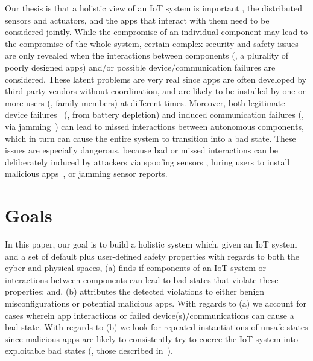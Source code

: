 Our thesis is that a holistic view of an IoT system is important \ie,
the distributed sensors and actuators, and the apps
that interact with them need to be considered jointly.
While the compromise of an individual component may lead to
the compromise of the whole system,
certain complex security and safety issues are only revealed when the interactions
between components (\eg, a plurality of poorly designed apps) and/or possible {\color{black}device/communication failures}
are considered.
These latent problems are very real since apps are often developed by
third-party vendors without coordination,
and are likely to be installed by one or more users (\eg, family members) at different times.
{\color{black}
Moreover, both legitimate device failures~\cite{Samsung:smartthingscom1,Samsung:smartthingscom2, Samsung:smartthingscom3, Samsung:smartthingscom4} (\eg, from battery depletion) and induced
communication failures
(\eg, via jamming~\cite{5473884})
can lead to missed interactions between autonomous components, which in turn can
cause
the entire system to transition into a bad state. 
}
These issues are especially dangerous,
because bad or missed interactions can be deliberately induced by attackers
via {\color{black} spoofing sensors  
\cite{son2015rocking,shin2016sampling},
luring users to install malicious apps~\cite{Jia:contexiot},
or jamming sensor reports}.

\section{Goals}
In this paper, our goal is to build a holistic \textcolor{black}{system}
which,
given an IoT system and
a set of default plus user-defined safety properties with regards to
both the cyber and physical {\color{black}spaces},
(a) finds if components of an IoT system
or interactions between components can lead to bad states that violate these properties;
and, (b) attributes the detected violations to either benign misconfigurations
or potential malicious apps.
With regards to (a) we account for cases wherein
app interactions or 
{\color{black}failed device(s)/communications} can cause a bad state.
With regards to (b) we look for repeated instantiations of unsafe states
since malicious apps are likely to
consistently try to coerce the IoT system into exploitable bad states
(\eg, those described in~\cite{Jia:contexiot}).

